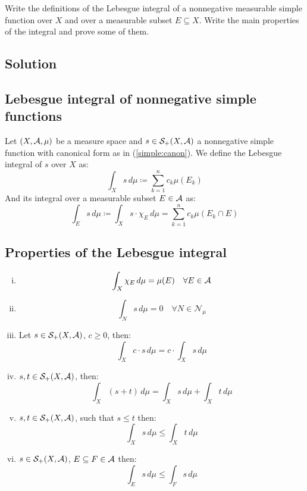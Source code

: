 

\question

Write the definitions of the Lebesgue integral of a nonnegative measurable simple 
function over $X$ and over a measurable subset $E \subseteq X$. Write the main properties of the integral and prove some of them.

\subsection*{Solution}

\subsection{Lebesgue integral of nonnegative simple functions}
Let $(X,\mathcal{A},\mu)$ be a measure space and $s\in\mathcal{S}_+(X,\mathcal{A})$ a nonnegative simple function with canonical form as in (\ref{simple:canon}). We define the Lebesgue integral of $s$ over $X$ as:
\[
    \int_X s\,d\mu \coloneqq \sum_{k=1}^n c_k \mu(E_k)
\]
And its integral over a measurable subset $E\in \mathcal{A}$ as:
\[
    \int_E s\,d\mu \coloneqq \int_X s\cdot \chi_E \, d\mu = \sum_{k=1}^n c_k \mu(E_k\cap E)
\]

\subsection{Properties of the Lebesgue integral}
\begin{enumerate}[i)]
    \item 
        \[
            \int_X \chi_E\,d\mu = \mu(E) \quad \forall E\in \mathcal{A}
        \]
    \item \label{LebInt:null}
        \[
            \int_N s\,d\mu = 0 \quad \forall N \in \mathcal{N}_\mu
        \]
    \item Let $s\in\mathcal{S}_+(X,\mathcal{A})$, $c\geq 0$, then:
        \[
            \int_X c\cdot s \,d\mu = c\cdot\int_X  s \,d\mu   
        \]
    \item $s,t\in \mathcal{S}_+(X,\mathcal{A})$, then:
        \[
            \int_X (s+t) \,d\mu = \int_X s \,d\mu + \int_X t \,d\mu
        \]
    \item \label{LebInt:monofunc}$s,t \in \mathcal{S}_+(X,\mathcal{A})$, such that $s\leq t$ then:
        \[
            \int_X s \,d\mu \leq \int_X t \,d\mu
        \]
    \item \label{LebInt:monoset}$s\in\mathcal{S}_+(X,\mathcal{A})$, $E\subseteq F \in\mathcal{A}$ then:
        \[
            \int_E s \,d\mu \leq \int_F s \,d\mu
        \]
\end{enumerate}

